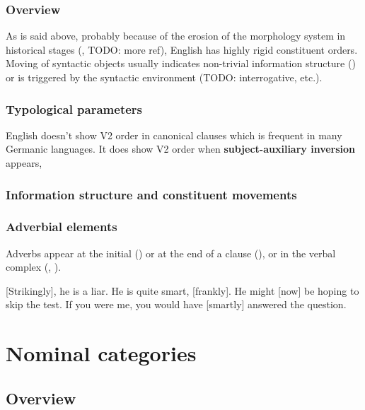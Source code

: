 \documentclass[UTF8, a4paper, oneside, scheme=plain]{ctexrep}
\newcommand*{\concept}[1]{\textbf{#1}}
\begin{document}
\subsection{Overview}

As is said above, probably because of the erosion of the morphology system in historical stages
(, TODO: more ref),
English has highly rigid constituent orders. 
Moving of syntactic objects usually indicates 
non-trivial information structure () 
or is triggered by the syntactic environment (TODO: interrogative, etc.).

\subsection{Typological parameters}

English doesn't show V2 order in canonical clauses which is frequent in many Germanic languages.
It does show V2 order when \concept{subject-auxiliary inversion} appears,


\subsection{Information structure and constituent movements}

\subsection{Adverbial elements}

Adverbs appear at the initial () or
at the end of a clause (), 
or in the verbal complex (, ).

\begin{exe}
    \ex\label{ex:overview.adverb-1} [Strikingly], he is a liar.
    \ex\label{ex:overview.adverb-2} He is quite smart, [frankly].
    \ex\label{ex:overview.adverb-3} He might [now] be hoping to skip the test.
    \ex\label{ex:overview.adverb-4} If you were me, you would have [smartly] answered the question.
\end{exe}

\chapter{Nominal categories}\label{chap:nouns}

\section{Overview}\label{sec:nouns.overview}
\end{document}
